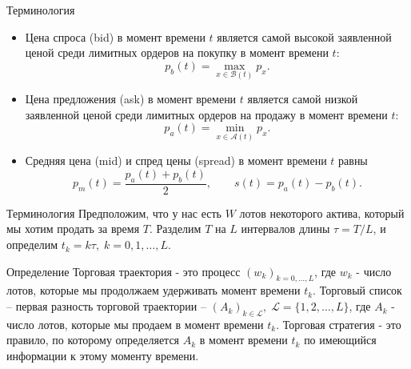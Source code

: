 \documentclass[aspectratio=169]{beamer}
\begin{document}
        \begin{frame}{Терминология}
            \begin{itemize}
            
                \item Цена спроса (bid) в момент времени $t$ является самой высокой заявленной ценой среди лимитных ордеров на покупку в момент времени $t$: 
                \begin{equation*}
                    p_b(t) = \max\limits_{x \in \mathcal B(t)} p_x.
                \end{equation*}
        
                \item Цена предложения (ask) в момент времени $t$ является самой низкой заявленной ценой среди лимитных ордеров на продажу в момент времени $t$:
                \begin{equation*}
                    p_a(t) = \min\limits_{x \in \mathcal A(t)} p_x.
                \end{equation*}

                \item  Средняя цена (mid) и спред цены (spread) в момент времени $t$ равны
                \begin{equation*}
                    p_m(t) = \frac{p_a(t) + p_b(t)}{2}, \qquad s(t) = p_a(t) - p_b(t).
                \end{equation*}
                
            \end{itemize} 
        \end{frame}

        \begin{frame}{Терминология}
            Предположим, что у нас есть $W$ лотов некоторого актива, который мы хотим продать за время $T$. Разделим $T$ на $L$ интервалов длины $\tau = T/L$, и определим $t_k = k\tau, \; k = 0,1, \ldots, L$.
        
            \begin{block}{Определение}
                Торговая траектория - это процесс $(w_k)_{k = 0, \ldots, L}$, где $w_k$ - число лотов, которые мы продолжаем удерживать момент времени $t_k$. 
                Торговый список -- первая разность торговой траектории -- $(A_k)_{k \in \mathcal L}, \; \mathcal L = \{1,2,\ldots, L \}$, где $A_k$ - число лотов, которые мы продаем в момент времени $t_k$. 
                Торговая стратегия - это правило, по которому определяется $A_k$ в момент времени $t_k$ по имеющийся информации к этому моменту времени. 
            \end{block}
        \end{frame}
\end{document}
